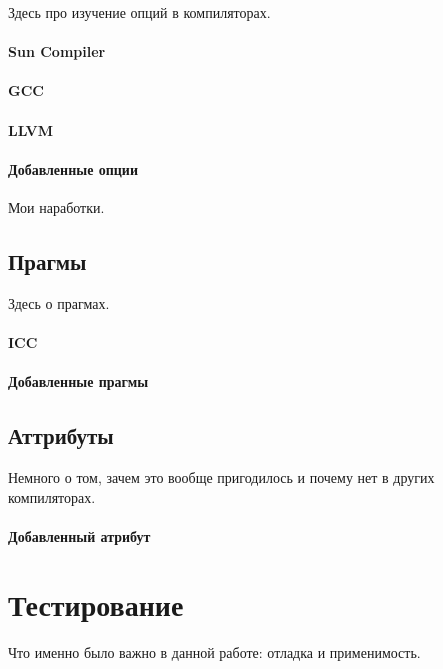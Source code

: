 \documentclass[12pt,a4paper]{article}
\begin{document}
Здесь про изучение опций в компиляторах.

\paragraph{Sun Compiler}

\paragraph{GCC}

\paragraph{LLVM}

\paragraph{Добавленные опции}

Мои наработки.

\subsection{Прагмы}

Здесь о прагмах.

\paragraph{ICC}

\paragraph{Добавленные прагмы}

\subsection{Аттрибуты}

Немного о том, зачем это вообще пригодилось и почему нет в других компиляторах.

\paragraph{Добавленный атрибут}

\section{Тестирование}

Что именно было важно в данной работе: отладка и применимость.
\end{document}
